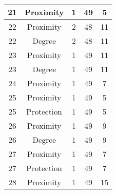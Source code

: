 \documentclass[results.tex]{subfiles}
\begin{document}
\begin{center}
\begin{tabular}{| c || c | c | c | c |}
            \hline
            21                      & Proximity                    & 1                      & 49                      & 5                    \\
            \hline
            22                      & Proximity                    & 2                      & 48                      & 11                   \\
            \hline
            22                      & Degree                       & 2                      & 48                      & 11                   \\
            \hline
            23                      & Proximity                    & 1                      & 49                      & 11                   \\
            \hline
            23                      & Degree                       & 1                      & 49                      & 11                   \\
            \hline
            24                      & Proximity                    & 1                      & 49                      & 7                    \\
            \hline
            25                      & Proximity                    & 1                      & 49                      & 5                    \\
            \hline
            25                      & Protection                   & 1                      & 49                      & 5                    \\
            \hline
            26                      & Proximity                    & 1                      & 49                      & 9                    \\
            \hline
            26                      & Degree                       & 1                      & 49                      & 9                    \\
            \hline
            27                      & Proximity                    & 1                      & 49                      & 7                    \\
            \hline
            27                      & Protection                   & 1                      & 49                      & 7                    \\
            \hline
            28                      & Proximity                    & 1                      & 49                      & 15                   \\

\end{tabular}
\end{center}
\end{document}
